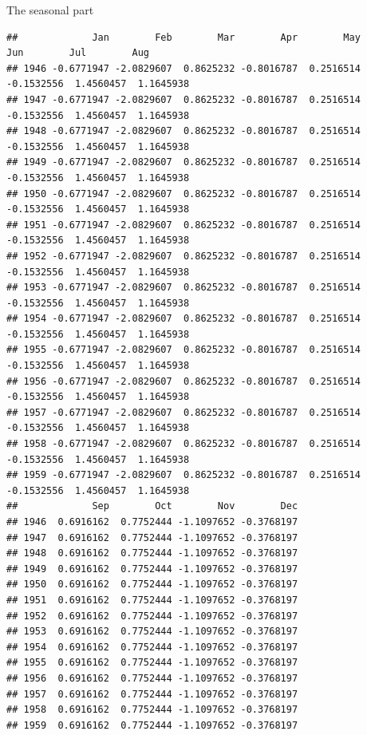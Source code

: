 \documentclass[
  ignorenonframetext,
]{beamer}
\begin{document}
\begin{frame}[fragile]{The seasonal part}
\begin{verbatim}
##             Jan        Feb        Mar        Apr        May        Jun        Jul        Aug
## 1946 -0.6771947 -2.0829607  0.8625232 -0.8016787  0.2516514 -0.1532556  1.4560457  1.1645938
## 1947 -0.6771947 -2.0829607  0.8625232 -0.8016787  0.2516514 -0.1532556  1.4560457  1.1645938
## 1948 -0.6771947 -2.0829607  0.8625232 -0.8016787  0.2516514 -0.1532556  1.4560457  1.1645938
## 1949 -0.6771947 -2.0829607  0.8625232 -0.8016787  0.2516514 -0.1532556  1.4560457  1.1645938
## 1950 -0.6771947 -2.0829607  0.8625232 -0.8016787  0.2516514 -0.1532556  1.4560457  1.1645938
## 1951 -0.6771947 -2.0829607  0.8625232 -0.8016787  0.2516514 -0.1532556  1.4560457  1.1645938
## 1952 -0.6771947 -2.0829607  0.8625232 -0.8016787  0.2516514 -0.1532556  1.4560457  1.1645938
## 1953 -0.6771947 -2.0829607  0.8625232 -0.8016787  0.2516514 -0.1532556  1.4560457  1.1645938
## 1954 -0.6771947 -2.0829607  0.8625232 -0.8016787  0.2516514 -0.1532556  1.4560457  1.1645938
## 1955 -0.6771947 -2.0829607  0.8625232 -0.8016787  0.2516514 -0.1532556  1.4560457  1.1645938
## 1956 -0.6771947 -2.0829607  0.8625232 -0.8016787  0.2516514 -0.1532556  1.4560457  1.1645938
## 1957 -0.6771947 -2.0829607  0.8625232 -0.8016787  0.2516514 -0.1532556  1.4560457  1.1645938
## 1958 -0.6771947 -2.0829607  0.8625232 -0.8016787  0.2516514 -0.1532556  1.4560457  1.1645938
## 1959 -0.6771947 -2.0829607  0.8625232 -0.8016787  0.2516514 -0.1532556  1.4560457  1.1645938
##             Sep        Oct        Nov        Dec
## 1946  0.6916162  0.7752444 -1.1097652 -0.3768197
## 1947  0.6916162  0.7752444 -1.1097652 -0.3768197
## 1948  0.6916162  0.7752444 -1.1097652 -0.3768197
## 1949  0.6916162  0.7752444 -1.1097652 -0.3768197
## 1950  0.6916162  0.7752444 -1.1097652 -0.3768197
## 1951  0.6916162  0.7752444 -1.1097652 -0.3768197
## 1952  0.6916162  0.7752444 -1.1097652 -0.3768197
## 1953  0.6916162  0.7752444 -1.1097652 -0.3768197
## 1954  0.6916162  0.7752444 -1.1097652 -0.3768197
## 1955  0.6916162  0.7752444 -1.1097652 -0.3768197
## 1956  0.6916162  0.7752444 -1.1097652 -0.3768197
## 1957  0.6916162  0.7752444 -1.1097652 -0.3768197
## 1958  0.6916162  0.7752444 -1.1097652 -0.3768197
## 1959  0.6916162  0.7752444 -1.1097652 -0.3768197
\end{verbatim}

\normalsize

\end{frame}
\end{document}
